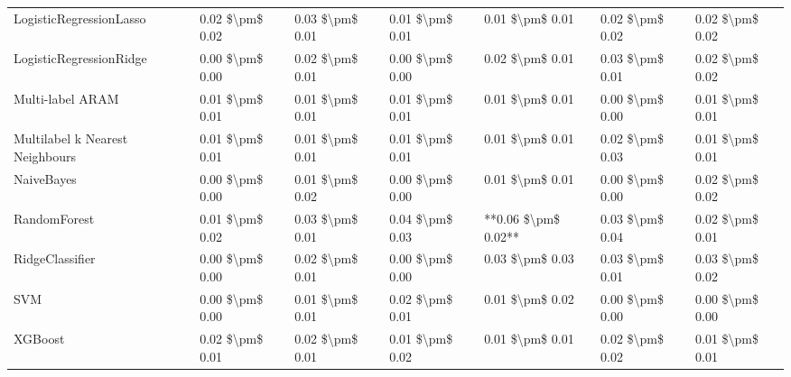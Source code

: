 \begin{tabular}{lllllll}
LogisticRegressionLasso         &  0.02 \$\textbackslash pm\$ 0.02 &           0.03 \$\textbackslash pm\$ 0.01 &       0.01 \$\textbackslash pm\$ 0.01 &        0.01 \$\textbackslash pm\$ 0.01 &                         0.02 \$\textbackslash pm\$ 0.02 &  0.02 \$\textbackslash pm\$ 0.02 \\
LogisticRegressionRidge         &  0.00 \$\textbackslash pm\$ 0.00 &           0.02 \$\textbackslash pm\$ 0.01 &       0.00 \$\textbackslash pm\$ 0.00 &        0.02 \$\textbackslash pm\$ 0.01 &                         0.03 \$\textbackslash pm\$ 0.01 &  0.02 \$\textbackslash pm\$ 0.02 \\
Multi-label ARAM                &  0.01 \$\textbackslash pm\$ 0.01 &           0.01 \$\textbackslash pm\$ 0.01 &       0.01 \$\textbackslash pm\$ 0.01 &        0.01 \$\textbackslash pm\$ 0.01 &                         0.00 \$\textbackslash pm\$ 0.00 &  0.01 \$\textbackslash pm\$ 0.01 \\
Multilabel k Nearest Neighbours &  0.01 \$\textbackslash pm\$ 0.01 &           0.01 \$\textbackslash pm\$ 0.01 &       0.01 \$\textbackslash pm\$ 0.01 &        0.01 \$\textbackslash pm\$ 0.01 &                         0.02 \$\textbackslash pm\$ 0.03 &  0.01 \$\textbackslash pm\$ 0.01 \\
NaiveBayes                      &  0.00 \$\textbackslash pm\$ 0.00 &           0.01 \$\textbackslash pm\$ 0.02 &       0.00 \$\textbackslash pm\$ 0.00 &        0.01 \$\textbackslash pm\$ 0.01 &                         0.00 \$\textbackslash pm\$ 0.00 &  0.02 \$\textbackslash pm\$ 0.02 \\
RandomForest                    &  0.01 \$\textbackslash pm\$ 0.02 &           0.03 \$\textbackslash pm\$ 0.01 &       0.04 \$\textbackslash pm\$ 0.03 &    **0.06 \$\textbackslash pm\$ 0.02** &                         0.03 \$\textbackslash pm\$ 0.04 &  0.02 \$\textbackslash pm\$ 0.01 \\
RidgeClassifier                 &  0.00 \$\textbackslash pm\$ 0.00 &           0.02 \$\textbackslash pm\$ 0.01 &       0.00 \$\textbackslash pm\$ 0.00 &        0.03 \$\textbackslash pm\$ 0.03 &                         0.03 \$\textbackslash pm\$ 0.01 &  0.03 \$\textbackslash pm\$ 0.02 \\
SVM                             &  0.00 \$\textbackslash pm\$ 0.00 &           0.01 \$\textbackslash pm\$ 0.01 &       0.02 \$\textbackslash pm\$ 0.01 &        0.01 \$\textbackslash pm\$ 0.02 &                         0.00 \$\textbackslash pm\$ 0.00 &  0.00 \$\textbackslash pm\$ 0.00 \\
XGBoost                         &  0.02 \$\textbackslash pm\$ 0.01 &           0.02 \$\textbackslash pm\$ 0.01 &       0.01 \$\textbackslash pm\$ 0.02 &        0.01 \$\textbackslash pm\$ 0.01 &                         0.02 \$\textbackslash pm\$ 0.02 &  0.01 \$\textbackslash pm\$ 0.01 \\
\bottomrule
\end{tabular}
